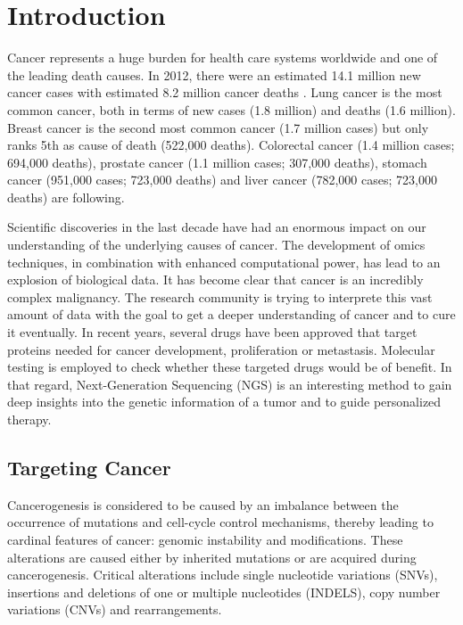 \section{Introduction}

  Cancer represents a huge burden for health care systems worldwide and one of
  the leading death causes. In 2012, there were an estimated 14.1 million new
  cancer cases with estimated  8.2 million cancer deaths
  {\cite{cancer_stats_worldwide:2012}}. Lung cancer is the most common cancer,
  both in terms of new cases (1.8 million) and deaths (1.6 million). Breast
  cancer is the second most common cancer (1.7 million cases) but only ranks 5th
  as cause of death (522,000 deaths). Colorectal cancer (1.4 million cases;
  694,000 deaths), prostate cancer (1.1 million cases; 307,000 deaths), stomach
  cancer (951,000 cases; 723,000 deaths) and liver cancer (782,000 cases;
  723,000 deaths) are following.

  Scientific discoveries in the last decade have had an enormous impact on our
  understanding of the underlying causes of cancer. The development of omics
  techniques, in combination with enhanced computational power, has lead to an
  explosion of biological data. It has become clear that cancer is an incredibly
  complex malignancy. The research community is trying to interprete this vast
  amount of data with the goal to get a deeper understanding of cancer and to
  cure it eventually. In recent years, several drugs have been approved that
  target proteins needed for cancer development, proliferation or metastasis.
  Molecular testing is employed to check whether these targeted drugs would be
  of benefit. In that regard, Next-Generation Sequencing (NGS) is an interesting
  method to gain deep insights into the genetic information of a tumor and to
  guide personalized therapy.

  \subsection{Targeting Cancer}

    Cancerogenesis is considered to be caused by an imbalance between the
    occurrence of mutations and cell-cycle control mechanisms, thereby leading
    to cardinal features of cancer: genomic instability and modifications. These
    alterations are caused either by inherited mutations or are acquired during
    cancerogenesis. Critical alterations include single nucleotide variations
    (SNVs), insertions and deletions of one or multiple nucleotides (INDELS),
    copy number variations (CNVs) and rearrangements.

